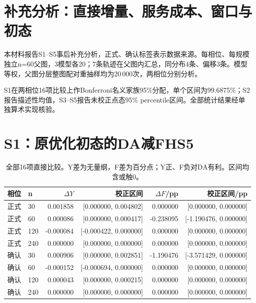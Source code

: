 \documentclass[UTF8,a4paper,twocolumn,fontset=none,zihao=5]{ctexart}
\begin{document}
\onecolumn{}

\section*{补充分析：直接增量、服务成本、窗口与初态}

本材料报告S1–S5事后补充分析，正式、确认标签表示数据来源。每相位、每规模独立n=60父图，3模型各20；7条轨迹在父图内汇总，同分布4条、偏移3条。模型等权，父图分层整图配对重抽样均为20\,000次，两相位分别分析。

S1在两相位16项比较上作Bonferroni名义家族95\%分配，单个区间为99.6875\%；S2报告描述性均值，S3–S5报告未校正点态95\% percentile区间。全部统计结果经单独算术实现核验。

\section*{S1：原优化初态的DA减FHS5}

\begin{table}[ht]\centering\caption{全部16项直接比较。Y差为无量纲，F差为百分点；Y正、F负对DA有利。区间均含或触0。}\small\begin{tabular}{llrrrr}\toprule 相位 & n & $\Delta Y$ & 校正区间 & $\Delta F$/pp & 校正区间/pp\\\midrule

正式 & 30 & 0.001858 & [0.000000, 0.004802] & 0.000000 & [0.000000, 0.000000] \\

正式 & 60 & 0.000086 & [0.000000, 0.000417] & -0.238095 & [-1.190476, 0.000000] \\

正式 & 120 & -0.000084 & [-0.000422, 0.000000] & 0.000000 & [0.000000, 0.000000] \\

正式 & 240 & 0.000000 & [0.000000, 0.000000] & 0.000000 & [0.000000, 0.000000] \\

确认 & 30 & 0.000906 & [0.000000, 0.002851] & -1.190476 & [-3.571429, 0.000000] \\

确认 & 60 & -0.000152 & [-0.000694, 0.000000] & 0.000000 & [0.000000, 0.000000] \\

确认 & 120 & 0.000043 & [0.000000, 0.000215] & 0.000000 & [0.000000, 0.000000] \\

确认 & 240 & 0.000000 & [0.000000, 0.000000] & 0.000000 & [0.000000, 0.000000] \\

\bottomrule\end{tabular}\end{table}
\end{document}
